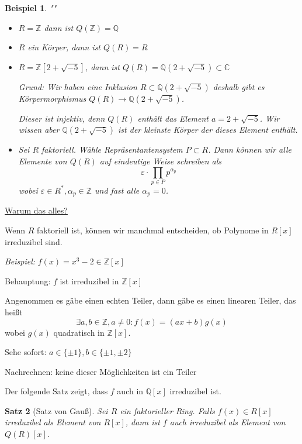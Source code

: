 \documentclass[a4paper,12pt,numbers=noenddot,parskip=full]{scrartcl}
\newcommand{\setZ}{\mathbb{Z}}
\newcommand{\setQ}{\mathbb{Q}}
\newcommand{\setC}{\mathbb{C}}
\newcommand{\heading}{\underline}
\theoremstyle{dotless}
\newtheorem{theorem}{Satz}[section]
\newtheorem{example}[theorem]{Beispiel}
\theoremstyle{remark}
\begin{document}
	\begin{example}""
		\begin{itemize}
			\item $R = \setZ$ dann ist $Q(\setZ) = \setQ$
			\item $R$ ein Körper, dann ist $Q(R) = R$
			\item $R = \setZ[2 + \sqrt{-5}]$, dann ist $Q(R) = \setQ(2 + \sqrt{-5}) \subset \setC$
			
			Grund: Wir haben eine Inklusion $R \subset \setQ(2 + \sqrt{-5})$ deshalb gibt es Körpermorphismus $Q(R) \to \setQ(2 + \sqrt{-5})$.
			
			Dieser ist injektiv, denn $Q(R)$ enthält das Element $a = 2 + \sqrt{-5}$. Wir wissen aber $\setQ(2 + \sqrt{-5})$ ist der kleinste Körper der dieses Element enthält.
			\item Sei $R$ faktoriell. Wähle Repräsentantensystem $P \subset R$. Dann können wir alle Elemente von $Q(R)$ auf eindeutige Weise schreiben als
			\begin{equation*}
				\varepsilon \cdot \prod_{p \in P} p^{\alpha_p}
			\end{equation*}
			wobei $\varepsilon \in R^*, \alpha_p \in \setZ$ und fast alle $\alpha_p = 0$.
		\end{itemize}
	\end{example}

	\heading{Warum das alles?}
	
	Wenn $R$ faktoriell ist, können wir manchmal entscheiden, ob Polynome in $R[x]$ irreduzibel sind.
	
	\textit{Beispiel:} $f(x) = x^3 - 2 \in \setZ[x]$
	
	Behauptung: $f$ ist irreduzibel in $\setZ[x]$
	
	Angenommen es gäbe einen echten Teiler, dann gäbe es einen linearen Teiler, das heißt
	\begin{equation*}
		\exists a,b \in \setZ, a \neq 0: f(x) = (ax + b) g(x)
	\end{equation*}
	wobei $g(x)$ quadratisch in $\setZ[x]$.
	
	Sehe sofort: $a \in \{ \pm 1 \}, b \in \{ \pm 1, \pm 2 \}$
	
	Nachrechnen: keine dieser Möglichkeiten ist ein Teiler
	
	Der folgende Satz zeigt, dass $f$ auch in $\setQ[x]$ irreduzibel ist.
	
	\begin{theorem}[Satz von Gauß]
		Sei $R$ ein faktorieller Ring. Falls $f(x) \in R[x]$ irreduzibel als Element von $R[x]$, dann ist $f$ auch irreduzibel als Element von $Q(R)[x]$.
	\end{theorem}
\end{document}
